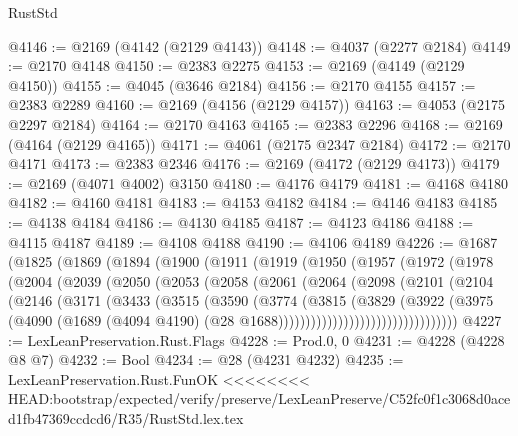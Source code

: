 \begin{lexlean}{RustStd}
\begin{coremodule}
{\begin{coremodule}
{{{{{{{{{{{{{{{{@4146 := @2169 (@4142 (@2129 @4143))
@4148 := @4037 (@2277 @2184)
@4149 := @2170 @4148
@4150 := @2383 @2275
@4153 := @2169 (@4149 (@2129 @4150))
@4155 := @4045 (@3646 @2184)
@4156 := @2170 @4155
@4157 := @2383 @2289
@4160 := @2169 (@4156 (@2129 @4157))
@4163 := @4053 (@2175 @2297 @2184)
@4164 := @2170 @4163
@4165 := @2383 @2296
@4168 := @2169 (@4164 (@2129 @4165))
@4171 := @4061 (@2175 @2347 @2184)
@4172 := @2170 @4171
@4173 := @2383 @2346
@4176 := @2169 (@4172 (@2129 @4173))
@4179 := @2169 (@4071 @4002) @3150
@4180 := @4176 @4179
@4181 := @4168 @4180
@4182 := @4160 @4181
@4183 := @4153 @4182
@4184 := @4146 @4183
@4185 := @4138 @4184
@4186 := @4130 @4185
@4187 := @4123 @4186
@4188 := @4115 @4187
@4189 := @4108 @4188
@4190 := @4106 @4189
@4226 := @1687
    (@1825
      (@1869
        (@1894
          (@1900
            (@1911
              (@1919
                (@1950
                  (@1957
                    (@1972
                      (@1978
                        (@2004
                          (@2039
                            (@2050
                              (@2053
                                (@2058
                                  (@2061
                                    (@2064
                                      (@2098
                                        (@2101
                                          (@2104
                                            (@2146
                                              (@3171
                                                (@3433
                                                  (@3515
                                                    (@3590
                                                      (@3774
                                                        (@3815
                                                          (@3829
                                                            (@3922
                                                              (@3975
                                                                (@4090
                                                                  (@1689
                                                                    (@4094 @4190)
                                                                    (@28
                                                                      @1688)))))))))))))))))))))))))))))))))
@4227 := LexLeanPreservation.Rust.Flags
@4228 := Prod.{0, 0}
@4231 := @4228 (@4228 @8 @7)
@4232 := Bool
@4234 := @28 (@4231 @4232)
@4235 := LexLeanPreservation.Rust.FunOK
<<<<<<<< HEAD:bootstrap/expected/verify/preserve/LexLeanPreserve/C52fc0f1c3068d0aced1fb47369ccdcd6/R35/RustStd.lex.tex
}}}}}}}}}}}}}}}}
\end{coremodule}}
\end{coremodule}
\end{lexlean}
